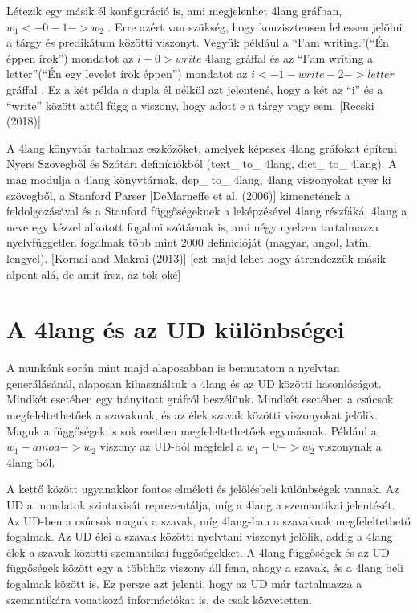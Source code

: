 Létezik egy másik él konfiguráció is, ami megjelenhet 4lang gráfban, $w_1 <-0-1-> w_2$ . Erre azért van szükség, hogy konzisztensen lehessen jelölni a tárgy és predikátum közötti viszonyt. Vegyük például a “I’am writing.”(“Én éppen írok”)  mondatot az $i -0> write$ 4lang gráffal és az “I’am writing a letter”(“Én egy levelet írok éppen”) mondatot az $i <-1- write -2-> letter$ gráffal . Ez a két példa a dupla él nélkül azt jelentené, hogy a két az “i” és a “write” között attól függ a viszony, hogy adott e a tárgy vagy sem. [Recski (2018)]

A 4lang könyvtár tartalmaz eszközöket, amelyek képesek 4lang gráfokat építeni Nyers Szövegből és Szótári definíciókból (text\_ to\_ 4lang, dict\_ to\_ 4lang). A mag modulja a 4lang könyvtárnak, dep\_ to\_ 4lang, 4lang viszonyokat nyer ki szövegből, a Stanford Parser [DeMarneffe et al. (2006)] kimenetének a feldolgozásával és a Stanford függőségeknek a leképzésével 4lang részfáká.
4lang a neve egy kézzel alkotott  fogalmi szótárnak is, ami négy nyelven tartalmazza nyelvfüggetlen fogalmak több mint 2000 definícióját (magyar, angol, latin, lengyel). [Kornai and Makrai (2013)]
[ezt majd lehet hogy átrendezzük másik alpont alá, de amit írsz, az tök oké]


\section{A 4lang és az UD különbségei}
A munkánk során mint majd alaposabban is bemutatom a nyelvtan generálásánál, alaposan kihasználtuk a 4lang és az UD közötti hasonlóságot. Mindkét esetében egy irányított gráfról beszélünk. Mindkét esetében a csúcsok megfeleltethetőek a szavaknak, és az élek szavak közötti viszonyokat jelölik. Maguk a függőségek is sok esetben megfeleltethetőek egymásnak. Például a $w_1 -amod-> w_2$ viszony az UD-ból megfelel a $w_1 -0-> w_2$ viszonynak a 4lang-ból.

A kettő között ugyanakkor fontos elméleti és jelölésbeli különbségek vannak. Az UD a mondatok szintaxisát reprezentálja, míg a 4lang a szemantikai jelentését. Az UD-ben a csúcsok maguk a szavak, míg 4lang-ban a szavaknak megfeleltethető fogalmak. Az UD élei a szavak közötti nyelvtani viszonyt jelölik, addig a 4lang élek a szavak közötti szemantikai függőségekket. A 4lang függőségek és az UD függőségek között egy a többhöz viszony áll fenn, ahogy a szavak, és a 4lang beli fogalmak között is. Ez persze azt jelenti, hogy az UD már tartalmazza a szemantikára vonatkozó információkat is, de csak közvetetten.

